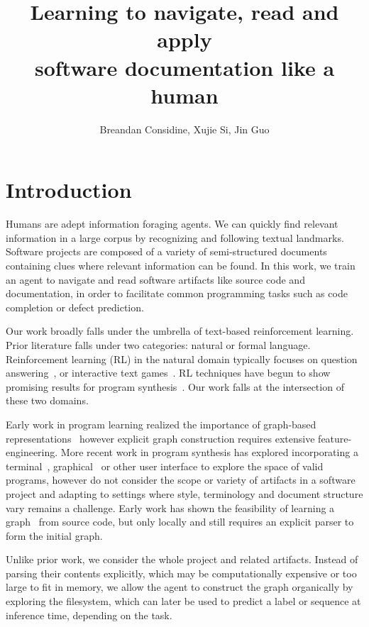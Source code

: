 \documentclass[11pt]{article}
\title{Learning to navigate, read and apply\\software documentation like a human}
\author{Breandan Considine, Xujie Si, Jin Guo}
\begin{document}
\maketitle

\section{Introduction}

Humans are adept information foraging agents. We can quickly find relevant information in a large corpus by recognizing and following textual landmarks. Software projects are composed of a variety of semi-structured documents containing clues where relevant information can be found. In this work, we train an agent to navigate and read software artifacts like source code and documentation, in order to facilitate common programming tasks such as code completion or defect prediction.

Our work broadly falls under the umbrella of text-based reinforcement learning. Prior literature falls under two categories: natural or formal language. Reinforcement learning (RL) in the natural domain typically focuses on question answering~\cite{buck2017ask, chen2019reinforcement}, or interactive text games~\cite{he2015deep,ammanabrolu2018playing,narasimhan2015language,guo2020interactive,ammanabrolu2020graph}. RL techniques have begun to show promising results for program synthesis~\cite{ellis2019write, johnson2020learning, chen2020program}. Our work falls at the intersection of these two domains.

Early work in program learning realized the importance of graph-based representations~\cite{allamanis2017learning} however explicit graph construction requires extensive feature-engineering. More recent work in program synthesis has explored incorporating a terminal~\cite{ellis2019write}, graphical~\cite{walke2020learning} or other user interface to explore the space of valid programs, however do not consider the scope or variety of artifacts in a software project and adapting to settings where style, terminology and document structure vary remains a challenge. Early work has shown the feasibility of learning a graph~\cite{johnson2020learning} from source code, but only locally and still requires an explicit parser to form the initial graph.

Unlike prior work, we consider the whole project and related artifacts. Instead of parsing their contents explicitly, which may be computationally expensive or too large to fit in memory, we allow the agent to construct the graph organically by exploring the filesystem, which can later be used to predict a label or sequence at inference time, depending on the task.
\end{document}
